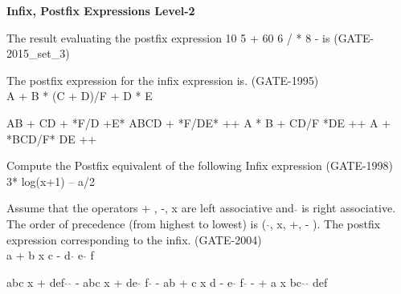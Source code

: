 
\centerline{\textbf{ \LARGE Infix, Postfix Expressions Level-2}}


\begin{questyle}
  \question  The result evaluating the postfix expression 10 5 + 60 6 / * 8 -  is  (GATE-2015\_set\_3)

  \begin{choices}
  \end{choices}
\end{questyle}


\begin{questyle}
  \question  The postfix expression for the infix expression is.  (GATE-1995)\\
              A + B * (C + D)/F + D * E

  \begin{choices}
    \choice         AB + CD + *F/D +E*
    \CorrectChoice  ABCD + *F/DE* ++
    \choice         A * B + CD/F *DE ++
    \choice         A + *BCD/F* DE ++
  \end{choices}
\end{questyle}


\begin{questyle}
  \question  Compute the Postfix equivalent of the following Infix expression \fillin[]  (GATE-1998) \\
              3* log(x+1) – a/2

\end{questyle}


\begin{questyle}
  \question   Assume that the operators + , -, x are left associative and \( \hat{} \) is right associative. The order of
              precedence (from highest to lowest) is (  \( \hat{} \), x, +, - ). The postfix expression corresponding to the infix. (GATE-2004) \\
              a + b x c - d \( \hat{} \) e \( \hat{} \) f

  \begin{choices}
    \CorrectChoice  abc x + def \( \hat{} \) \( \hat{} \) -
    \choice         abc x + de \( \hat{} \) f \( \hat{} \) -
    \choice         ab + c x d - e \( \hat{} \) f  \( \hat{} \)
    \choice         - + a x bc \( \hat{} \) \( \hat{} \) def
  \end{choices}
\end{questyle}



